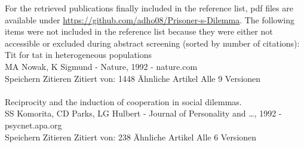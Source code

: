 \documentclass[11pt]{article}
\begin{document}
For the retrieved publications finally included in the reference list, pdf files are available under \url{https://github.com/adho08/Prisoner-s-Dilemma}.
The following items were not included in the reference list because they were either not accessible or excluded during abstract screening (sorted by number of citations):\\

\noindent 
Tit for tat in heterogeneous populations\\
MA Nowak, K Sigmund - Nature, 1992 - nature.com\\
Speichern Zitieren Zitiert von: 1448 Ähnliche Artikel Alle 9 Versionen\\
\\
\noindent 
Reciprocity and the induction of cooperation in social dilemmas.\\
SS Komorita, CD Parks, LG Hulbert - Journal of Personality and …, 1992 - psycnet.apa.org\\
Speichern Zitieren Zitiert von: 238 Ähnliche Artikel Alle 6 Versionen\\
\end{document}

